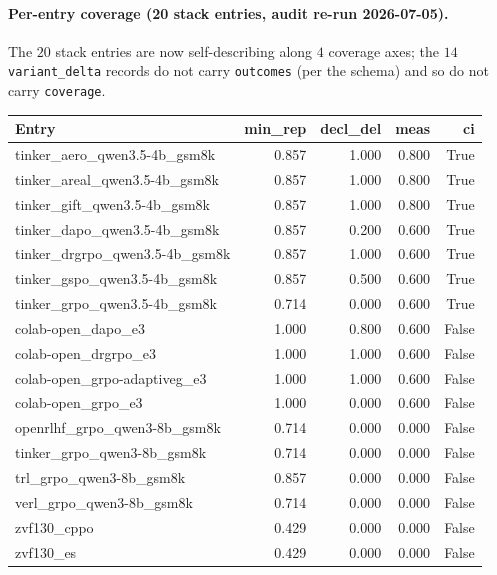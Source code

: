 \documentclass{article}
\begin{document}
\paragraph{Per-entry coverage (20 stack entries, audit re-run 2026-07-05).}
The $20$ stack entries are now self-describing along $4$ coverage
axes; the $14$ \texttt{variant\_delta} records do not carry
\texttt{outcomes} (per the schema) and so do not carry
\texttt{coverage}.

\begin{table}[h]
\centering
\small
\begin{tabular}{lrrrr}
\toprule
\textbf{Entry} & \textbf{min\_rep} & \textbf{decl\_del} & \textbf{meas} & \textbf{ci} \\
\midrule
tinker\_aero\_qwen3.5-4b\_gsm8k     & 0.857 & 1.000 & 0.800 & True \\
tinker\_areal\_qwen3.5-4b\_gsm8k    & 0.857 & 1.000 & 0.800 & True \\
tinker\_gift\_qwen3.5-4b\_gsm8k     & 0.857 & 1.000 & 0.800 & True \\
tinker\_dapo\_qwen3.5-4b\_gsm8k     & 0.857 & 0.200 & 0.600 & True \\
tinker\_drgrpo\_qwen3.5-4b\_gsm8k   & 0.857 & 1.000 & 0.600 & True \\
tinker\_gspo\_qwen3.5-4b\_gsm8k     & 0.857 & 0.500 & 0.600 & True \\
tinker\_grpo\_qwen3.5-4b\_gsm8k    & 0.714 & 0.000 & 0.600 & True \\
colab-open\_dapo\_e3                & 1.000 & 0.800 & 0.600 & False \\
colab-open\_drgrpo\_e3              & 1.000 & 1.000 & 0.600 & False \\
colab-open\_grpo-adaptiveg\_e3      & 1.000 & 1.000 & 0.600 & False \\
colab-open\_grpo\_e3                & 1.000 & 0.000 & 0.600 & False \\
openrlhf\_grpo\_qwen3-8b\_gsm8k     & 0.714 & 0.000 & 0.000 & False \\
tinker\_grpo\_qwen3-8b\_gsm8k       & 0.714 & 0.000 & 0.000 & False \\
trl\_grpo\_qwen3-8b\_gsm8k          & 0.857 & 0.000 & 0.000 & False \\
verl\_grpo\_qwen3-8b\_gsm8k         & 0.714 & 0.000 & 0.000 & False \\
zvf130\_cppo                        & 0.429 & 0.000 & 0.000 & False \\
zvf130\_es                          & 0.429 & 0.000 & 0.000 & False \\

\end{tabular}
\end{table}
\end{document}
